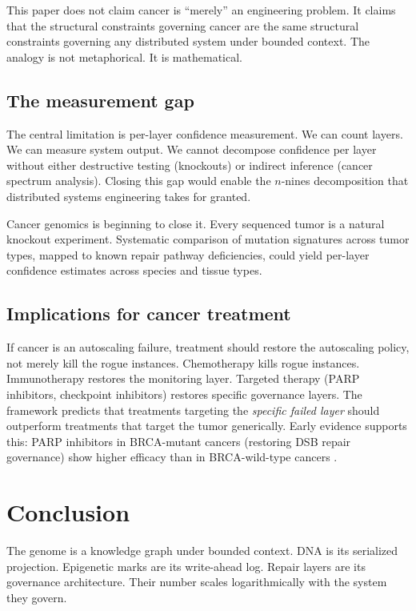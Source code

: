 \documentclass[11pt]{article}
\theoremstyle{definition}
\begin{document}
This paper does not claim cancer is ``merely'' an engineering problem.
It claims that the structural constraints governing cancer are the
same structural constraints governing any distributed system under
bounded context. The analogy is not metaphorical. It is mathematical.

\subsection{The measurement gap}

The central limitation is per-layer confidence measurement. We can
count layers. We can measure system output. We cannot decompose
confidence per layer without either destructive testing (knockouts)
or indirect inference (cancer spectrum analysis). Closing this gap
would enable the $n$-nines decomposition that distributed systems
engineering takes for granted.

Cancer genomics is beginning to close it. Every sequenced tumor is a
natural knockout experiment. Systematic comparison of mutation
signatures across tumor types, mapped to known repair pathway
deficiencies, could yield per-layer confidence estimates across
species and tissue types.

\subsection{Implications for cancer treatment}

If cancer is an autoscaling failure, treatment should restore the
autoscaling policy, not merely kill the rogue instances. Chemotherapy
kills rogue instances. Immunotherapy restores the monitoring layer.
Targeted therapy (PARP inhibitors, checkpoint inhibitors) restores
specific governance layers. The framework predicts that treatments
targeting the \emph{specific failed layer} should outperform treatments
that target the tumor generically. Early evidence supports this:
PARP inhibitors in BRCA-mutant cancers (restoring DSB repair
governance) show higher efficacy than in BRCA-wild-type cancers
\cite{Lord2017}.

\section{Conclusion}
\label{sec:conclusion}

The genome is a knowledge graph under bounded context. DNA is its
serialized projection. Epigenetic marks are its write-ahead log.
Repair layers are its governance architecture. Their number scales
logarithmically with the system they govern.
\end{document}
